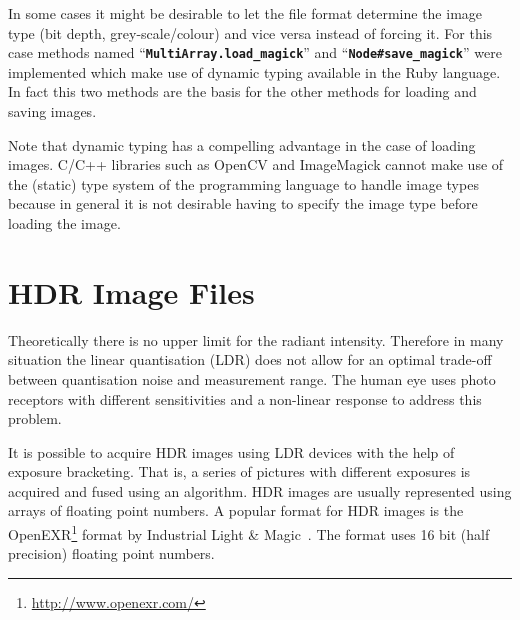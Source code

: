 \documentclass[12pt,a4paper,oneside,openright]{book}
\newcommand{\Ie}{That is, }
\newcommand{\code}[1]{``\texttt{\textbf{\textcolor{codegray}{\small{#1}}}}''}
\begin{document}
\begin{CJK}{UTF8}{}
In some cases it might be desirable to let the file format determine the image type (bit depth, grey-scale/colour) and vice versa instead of forcing it. For this case methods named \code{MultiArray.load\_magick} and \code{Node\#save\_magick} were implemented which make use of dynamic typing available in the Ruby language. In fact this two methods are the basis for the other methods for loading and saving images.

Note that dynamic typing has a compelling advantage in the case of loading images. C/C++ libraries such as OpenCV and ImageMagick cannot make use of the (static) type system of the programming language to handle image types because in general it is not desirable having to specify the image type before loading the image.

\section{\acs{HDR} Image Files}\label{cha:hdr}
Theoretically there is no upper limit for the radiant intensity. Therefore in many situation the linear quantisation (\acl{LDR}) does not allow for an optimal trade-off between quantisation noise and measurement range. The human eye uses photo receptors with different sensitivities and a non-linear response to address this problem.

It is possible to acquire \ac{HDR} images using \ac{LDR} devices with the help of exposure bracketing. \Ie a series of pictures with different exposures is acquired and fused using an algorithm. \ac{HDR} images are usually represented using arrays of floating point numbers. A popular format for \ac{HDR} images is the OpenEXR\footnote{\url{http://www.openexr.com/}} format by Industrial Light \& Magic~\citep{openexr}. The format uses 16 bit (half precision) floating point numbers.


\end{CJK}
\end{document}
